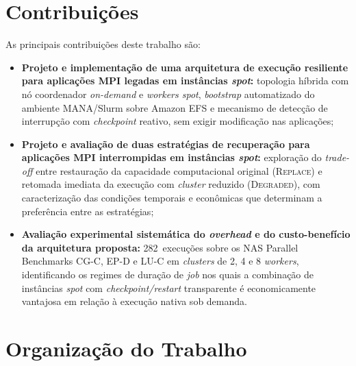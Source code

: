 \section{Contribuições}
\label{sec:contribuicoes}

As principais contribuições deste trabalho são:

\begin{itemize}
  \item \textbf{Projeto e implementação de uma arquitetura de execução resiliente para
        aplicações MPI legadas em instâncias \textit{spot}:} topologia híbrida com nó
        coordenador \textit{on-demand} e \textit{workers spot}, \textit{bootstrap}
        automatizado do ambiente MANA/Slurm sobre Amazon EFS e mecanismo de detecção
        de interrupção com \textit{checkpoint} reativo, sem exigir modificação nas
        aplicações;

  \item \textbf{Projeto e avaliação de duas estratégias de recuperação para
        aplicações MPI interrompidas em instâncias \textit{spot}:} exploração do
        \textit{trade-off} entre restauração da capacidade computacional original
        (\textsc{Replace}) e retomada imediata da execução com \textit{cluster} reduzido
        (\textsc{Degraded}), com caracterização das condições temporais e econômicas que
        determinam a preferência entre as estratégias;

  \item \textbf{Avaliação experimental sistemática do \textit{overhead} e do
        custo-benefício da arquitetura proposta:} 282~execuções sobre os NAS Parallel
        Benchmarks CG-C, EP-D e LU-C em \textit{clusters} de 2, 4 e 8
        \textit{workers}, identificando os regimes de duração de \textit{job} nos quais
        a combinação de instâncias \textit{spot} com \textit{checkpoint/restart}
        transparente é economicamente vantajosa em relação à execução nativa sob
        demanda.
\end{itemize}


\section{Organização do Trabalho}
\label{sec:organizacao}

